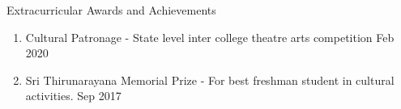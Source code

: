 \begin{rSection}{Extracurricular Awards and Achievements} 
\begin{enumerate}[itemsep=-0.5em, leftmargin=-0.8em, rightmargin=0.3em]
    \item []Cultural Patronage - State level inter college theatre arts competition \hfill Feb 2020
    \item [] Sri Thirunarayana Memorial Prize - For best freshman student in cultural activities. \hfill Sep 2017

\end{enumerate}
\end{rSection}